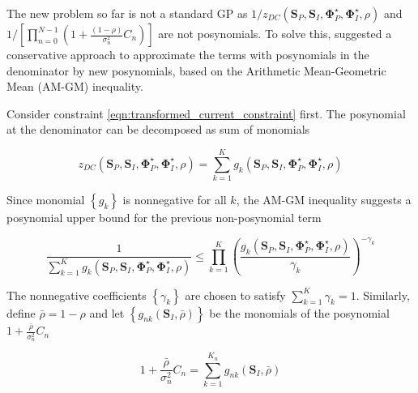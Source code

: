 The new problem so far is not a standard GP as $1/{z_{DC}}\left( {{{\mathbf{S}}_P},{{\mathbf{S}}_I},{\mathbf{\Phi }}_P^ \star ,{\mathbf{\Phi }}_I^ \star ,\rho } \right)$ and $1/\left[ {\prod\nolimits_{n = 0}^{N - 1} {\left( {1 + \frac{{(1 - \rho )}}{{\sigma _n^2}}{C_n}} \right)} } \right]$ are not posynomials. To solve this, \cite{Clerckx2018} suggested a conservative approach to approximate the terms with posynomials in the denominator by new posynomials, based on the Arithmetic Mean-Geometric Mean (AM-GM) inequality.

Consider constraint \ref{eqn:transformed_current_constraint} first. The posynomial at the denominator can be decomposed as sum of monomials

\begin{equation}\label{eqn:transformed_current_posynomial_decomposition}
  {z_{DC}}\left( {{{\mathbf{S}}_P},{{\mathbf{S}}_I},{\mathbf{\Phi }}_P^ \star ,{\mathbf{\Phi }}_I^ \star ,\rho } \right) = \sum\limits_{k = 1}^K {{g_k}\left( {{{\mathbf{S}}_P},{{\mathbf{S}}_I},{\mathbf{\Phi }}_P^ \star ,{\mathbf{\Phi }}_I^ \star ,\rho } \right)} 
\end{equation}

Since monomial $\left\{ {{g_k}} \right\}$ is nonnegative for all $k$, the AM-GM inequality suggests a posynomial upper bound for the previous non-posynomial term

\begin{equation}\label{eqn:transformed_current_am_gm}
  \frac{1}{{\sum\limits_{k = 1}^K {{g_k}\left( {{{\mathbf{S}}_P},{{\mathbf{S}}_I},{\mathbf{\Phi }}_P^ \star ,{\mathbf{\Phi }}_I^ \star ,\rho } \right)} }} \leqslant \prod\limits_{k = 1}^K {{{\left( {\frac{{{g_k}\left( {{{\mathbf{S}}_P},{{\mathbf{S}}_I},{\mathbf{\Phi }}_P^ \star ,{\mathbf{\Phi }}_I^ \star ,\rho } \right)}}{{{\gamma _k}}}} \right)}^{ - {\gamma _k}}}} 
\end{equation}

The nonnegative coefficients $\left\{ {{\gamma _k}} \right\}$ are chosen to satisfy $\sum\nolimits_{k = 1}^K {{\gamma _k}}  = 1$. Similarly, define $\bar \rho  = 1 - \rho $ and let $\left\{ {{g_{nk}}\left( {{{\mathbf{S}}_I},\bar \rho } \right)} \right\}$ be the monomials of the posynomial $1 + \frac{{\bar \rho }}{{\sigma _n^2}}{C_n}$

\begin{equation}\label{eqn:transformed_rate_posynomial_decomposition}
  1 + \frac{{\bar \rho }}{{\sigma _n^2}}{C_n} = \sum\limits_{k = 1}^{{K_n}} {{g_{nk}}} \left( {{{\mathbf{S}}_I},\bar \rho } \right)
\end{equation}


